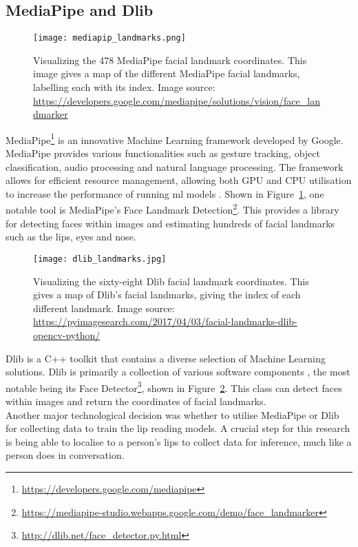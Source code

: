 \subsection{MediaPipe and Dlib}
\label{sec:mediapipe}
\begin{figure}
\centering
\texttt{[image: mediapip\_landmarks.png]}
\caption[Visualizing the 478 MediaPipe facial landmark coordinates.]{Visualizing the 478 MediaPipe facial landmark coordinates. This image gives a map of the different MediaPipe facial landmarks, labelling each with its index. Image source: \url{https://developers.google.com/mediapipe/solutions/vision/face_landmarker}}
\label{fig:mediapipe landmarks}
\end{figure}
MediaPipe\footnote{\url{https://developers.google.com/mediapipe}}  is an innovative Machine Learning framework developed by Google. MediaPipe provides various functionalities such as gesture tracking, object classification, audio processing and natural language processing. The framework allows for efficient resource management, allowing both GPU and CPU utilisation to increase the performance of running \acrshort{ml} models \cite{mediapipe_info}. Shown in Figure~\ref{fig:mediapipe landmarks}, one notable tool is MediaPipe's Face Landmark Detection\footnote{\url{https://mediapipe-studio.webapps.google.com/demo/face_landmarker}}. This provides a library for detecting faces within images and estimating hundreds of facial landmarks such as the lips, eyes and nose. \\
\begin{figure}
\centering
\texttt{[image: dlib\_landmarks.jpg]}
\caption[Visualizing the sixty-eight Dlib facial landmark coordinates.]{Visualizing the sixty-eight Dlib facial landmark coordinates. This gives a map of Dlib's facial landmarks, giving the index of each different landmark. Image source: \url{https://pyimagesearch.com/2017/04/03/facial-landmarks-dlib-opencv-python/}}
\label{fig:dlib landmarks}
\end{figure}
Dlib is a C++ toolkit that contains a diverse selection of Machine Learning solutions. Dlib is primarily a collection of various software components \cite{dlib_info}, the most notable being its Face Detector\footnote{\url{http://dlib.net/face_detector.py.html}}, shown in Figure~\ref{fig:dlib landmarks}. This class can detect faces within images and return the coordinates of facial landmarks.\\
Another major technological decision was whether to utilise MediaPipe or Dlib for collecting data to train the lip reading models. A crucial step for this research is being able to localise to a person's lips to collect data for inference, much like a person does in conversation.\\
